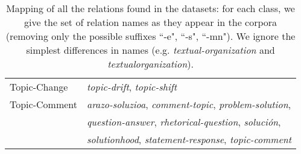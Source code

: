 \documentclass[11pt]{article}
\newcommand{\rel}[1]{\textit{#1}}
\newcommand{\crel}[1]{{\sc #1}\xspace}
\begin{document}
\begin{table*}
\begin{tabular}{ll}
\crel{Topic-Change}	&	\rel{topic-drift}, \rel{topic-shift}	\\
\crel{Topic-Comment}	&	\rel{arazo-soluzioa}, \rel{comment-topic}, \rel{problem-solution},  \\
& \rel{question-answer}, \rel{rhetorical-question}, \rel{soluci{\'o}n}, \\
&  \rel{solutionhood}, \rel{statement-response}, \rel{topic-comment}	\\
\bottomrule
\end{tabular}\caption{Mapping of all the relations found in the datasets: for each class, we give the set of relation names as they appear in the corpora (removing only the possible suffixes ``-e", ``-s", ``-mn"). We ignore the simplest differences in names (e.g. \rel{textual-organization} and \rel{textualorganization}).}
\end{table*}
\end{document}
